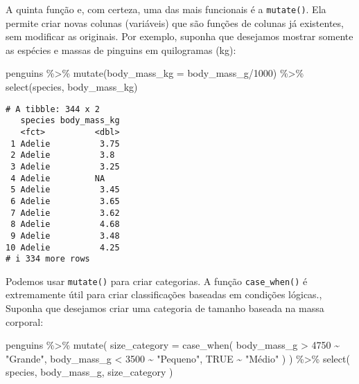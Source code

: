 \documentclass[
  12pt,
  letterpaper,
  DIV=11,
  numbers=noendperiod]{scrreprt}
\newenvironment{Shaded}{\begin{snugshade}}{\end{snugshade}}
\newcommand{\AttributeTok}[1]{\textcolor[rgb]{0.40,0.45,0.13}{#1}}
\newcommand{\ConstantTok}[1]{\textcolor[rgb]{0.56,0.35,0.01}{#1}}
\newcommand{\DecValTok}[1]{\textcolor[rgb]{0.68,0.00,0.00}{#1}}
\newcommand{\FunctionTok}[1]{\textcolor[rgb]{0.28,0.35,0.67}{#1}}
\newcommand{\NormalTok}[1]{\textcolor[rgb]{0.00,0.23,0.31}{#1}}
\newcommand{\SpecialCharTok}[1]{\textcolor[rgb]{0.37,0.37,0.37}{#1}}
\newcommand{\StringTok}[1]{\textcolor[rgb]{0.13,0.47,0.30}{#1}}
\begin{document}
A quinta função e, com certeza, uma das mais funcionais é a
\texttt{mutate()}. Ela permite criar novas colunas (variáveis) que são
funções de colunas já existentes, sem modificar as originais. Por
exemplo, suponha que desejamos mostrar somente as espécies e massas de
pinguins em quilogramas (kg):

\begin{Shaded}
\begin{Highlighting}[]
\NormalTok{penguins }\SpecialCharTok{\%\textgreater{}\%} 
  \FunctionTok{mutate}\NormalTok{(}\AttributeTok{body\_mass\_kg =}\NormalTok{ body\_mass\_g}\SpecialCharTok{/}\DecValTok{1000}\NormalTok{) }\SpecialCharTok{\%\textgreater{}\%} 
  \FunctionTok{select}\NormalTok{(species, body\_mass\_kg)}
\end{Highlighting}
\end{Shaded}

\begin{verbatim}
# A tibble: 344 x 2
   species body_mass_kg
   <fct>          <dbl>
 1 Adelie          3.75
 2 Adelie          3.8 
 3 Adelie          3.25
 4 Adelie         NA   
 5 Adelie          3.45
 6 Adelie          3.65
 7 Adelie          3.62
 8 Adelie          4.68
 9 Adelie          3.48
10 Adelie          4.25
# i 334 more rows
\end{verbatim}

\noindent Podemos usar \texttt{mutate()} para criar categorias. A função
\texttt{case\_when()} é extremamente útil para criar classificações
baseadas em condições lógicas., Suponha que desejamos criar uma
categoria de tamanho baseada na massa corporal:

\begin{Shaded}
\begin{Highlighting}[]
\NormalTok{penguins }\SpecialCharTok{\%\textgreater{}\%} 
  \FunctionTok{mutate}\NormalTok{(}
    \AttributeTok{size\_category =} \FunctionTok{case\_when}\NormalTok{(}
\NormalTok{      body\_mass\_g }\SpecialCharTok{\textgreater{}} \DecValTok{4750} \SpecialCharTok{\textasciitilde{}} \StringTok{"Grande"}\NormalTok{,}
\NormalTok{      body\_mass\_g }\SpecialCharTok{\textless{}} \DecValTok{3500} \SpecialCharTok{\textasciitilde{}} \StringTok{"Pequeno"}\NormalTok{,}
      \ConstantTok{TRUE} \SpecialCharTok{\textasciitilde{}} \StringTok{"Médio"}
\NormalTok{    )}
\NormalTok{  ) }\SpecialCharTok{\%\textgreater{}\%} 
  \FunctionTok{select}\NormalTok{(}
\NormalTok{    species, body\_mass\_g, size\_category}
\NormalTok{  )}
\end{Highlighting}
\end{Shaded}
\end{document}

